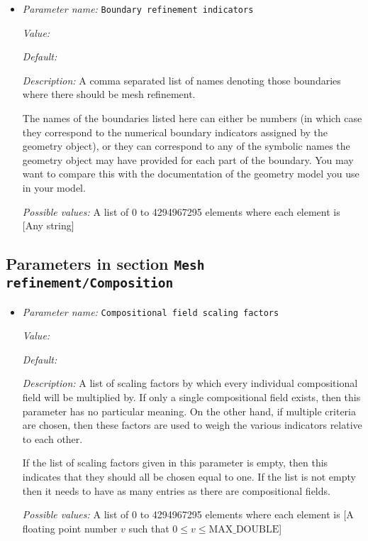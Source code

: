 \begin{itemize}
\item {\it Parameter name:} {\tt Boundary refinement indicators}
\label{parameters:Mesh refinement/Boundary/Boundary refinement indicators}


{\it Value:} 


{\it Default:} 


{\it Description:} A comma separated list of names denoting those boundaries where there should be mesh refinement.

The names of the boundaries listed here can either be numbers (in which case they correspond to the numerical boundary indicators assigned by the geometry object), or they can correspond to any of the symbolic names the geometry object may have provided for each part of the boundary. You may want to compare this with the documentation of the geometry model you use in your model.


{\it Possible values:} A list of 0 to 4294967295 elements where each element is [Any string]
\end{itemize}

\subsection{Parameters in section \tt Mesh refinement/Composition}
\label{parameters:Mesh_20refinement/Composition}

\begin{itemize}
\item {\it Parameter name:} {\tt Compositional field scaling factors}
\label{parameters:Mesh refinement/Composition/Compositional field scaling factors}


{\it Value:} 


{\it Default:} 


{\it Description:} A list of scaling factors by which every individual compositional field will be multiplied by. If only a single compositional field exists, then this parameter has no particular meaning. On the other hand, if multiple criteria are chosen, then these factors are used to weigh the various indicators relative to each other. 

If the list of scaling factors given in this parameter is empty, then this indicates that they should all be chosen equal to one. If the list is not empty then it needs to have as many entries as there are compositional fields.


{\it Possible values:} A list of 0 to 4294967295 elements where each element is [A floating point number $v$ such that $0 \leq v \leq \text{MAX\_DOUBLE}$]
\end{itemize}


